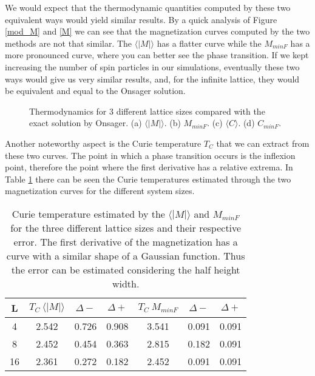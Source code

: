 	We would expect that the thermodynamic quantities computed by these two equivalent ways would yield similar results. By a quick analysis of Figure \ref{mod_M} and \ref{M} we can see that the magnetization curves computed by the two methods are not that similar. The $\langle |M| \rangle$ has a flatter curve while the $M_{minF}$ has a more pronounced curve, where you can better see the phase transition. If we kept increasing the number of spin particles in our simulations, eventually these two ways would give us very similar results, and, for the infinite lattice, they would be equivalent and equal to the Onsager solution. 
\begin{figure}[h]
	\centering
	
	\caption{Thermodynamics for 3 different lattice sizes compared with the exact solution by Onsager. (a) $\langle |M| \rangle$. (b) $M_{minF}$. (c) $\langle C \rangle$. (d) $C_{minF}$.}
	\label{thermo_4}
\end{figure}
	Another noteworthy aspect is the Curie temperature $T_C$ that we can extract from these two curves. The point in which a phase transition occurs is the inflexion point, therefore the point where the first derivative has a relative extrema. In Table \ref{TC_table} there can be seen the Curie temperatures estimated through the two magnetization curves for the different system sizes. 

\begin{table}[h]
\centering
\caption{Curie temperature estimated by the $\langle |M| \rangle$ and $M_{minF}$ for the three different lattice sizes and their respective error. The first derivative of the magnetization has a curve with a similar shape of a Gaussian function. Thus the error can be estimated considering the half height width.}
\begin{tabular}{c|ccc|ccc}
L  & $T_C\ \langle |M| \rangle$ & $\Delta -$ & $\Delta +$ & $T_C\ M_{minF}$ & $\Delta -$ & $\Delta +$ \\ \hline
4  & 2.542                                                 & 0.726                  & 0.908         & 3.541           & 0.091                  & 0.091                \\
8  & 2.452                                                 & 0.454                   & 0.363                  & 2.815           & 0.182         & 0.091                  \\
16 & 2.361                                                 & 0.272                  & 0.182                  & 2.452           & 0.091                  & 0.091                 
\end{tabular}
\label{TC_table}
\end{table}

